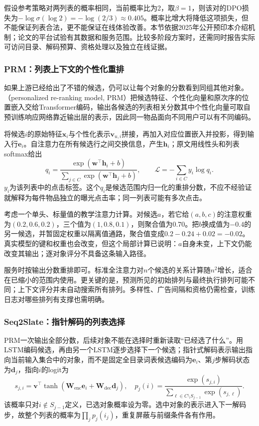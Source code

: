 假设参考策略对两列表的概率相同，当前概率比为2，取$\beta=1$，则该对的DPO损失为$-\log\sigma(\log2)=-\log(2/3)\approx0.405$。概率比增大将降低这项损失，但不能保证列表合法，更不能保证在线体验改善。本节依据2025年公开预印本介绍机制；论文的平台试验有其数据和服务范围。比较多阶段方案时，还需同时报告实际可访问目录、解码预算、资格处理以及独立在线证据。

\subsubsection{PRM：列表上下文的个性化重排}
\label{sec:rs-prm}

如果上游已经给出了不错的候选，仍可以让每个对象的分数看到同组其他对象。（personalized re-ranking model, PRM）把候选特征、个性化向量和原次序的位置嵌入交给Transformer编码，输出各候选的列表相关分数其中个性化向量可取自预训练响应网络靠近输出层的表示，因此同一物品面向不同用户可以有不同编码。

将候选$i$的原始特征$\bm x_i$与个性化表示$\bm v_{u,i}$拼接，再加入对应位置嵌入并投影，得到输入行$\bm e_i$。自注意力在所有候选行之间交换信息，产生$\bm h_i$；原文用线性头和列表softmax给出
\[
 q_i=\frac{\exp(\bm w^\top\bm h_i+b)}
 {\sum_{j\in C}\exp(\bm w^\top\bm h_j+b)},
 \qquad
 \mathcal L=-\sum_{i\in C}y_i\log q_i.
\]
$y_i$为该列表中的点击标签。这个$q_i$是候选范围内归一化的重排分数，不应不经验证就解释为每件物品独立的曝光点击率；同一列表可能有多次点击。

考虑一个单头、标量值的教学注意力计算。对候选$a$，若它给$(a,b,c)$的注意权重为$(0.2,0.6,0.2)$，三个值为$(1,0.8,0.1)$，则聚合值为0.70。把$b$换成值为$-0.4$的另一候选，并暂固定权重以隔离值通路，聚合值变成$0.2-0.24+0.02=-0.02$。真实模型的键和权重也会改变，但这个局部计算已说明：$a$自身未变，上下文仍能改变其输出；逐对象评分不具备这条输入路径。

服务时按输出分数重排即可。标准全注意力对$n$个候选的关系计算随$n^2$增长，适合在已缩小的范围内使用。更关键的是，预测所见的初始排列与最终执行排列可能不同；上下文评分并未自动搜索所有排列。多样性、广告间隔和资格仍需检查，训练日志对哪些排列有支撑也需明确。

\subsubsection{Seq2Slate：指针解码的列表选择}
\label{sec:rs-seq2slate}

PRM一次输出全部分数，后续对象不能在选择时重新读取“已经选了什么”。用LSTM编码候选，再由另一个LSTM逐步选择下一个候选；指针式解码表示输出指向当前输入集合中的对象，而不是固定全目录词表候选编码为$\bm e_i$、第$j$步解码状态为$\bm d_j$，指向$i$的logit为
\begin{equation}
 s_{j,i}=\bm v^\top\tanh(\bm W_{\mathrm{enc}}\bm e_i+
                          \bm W_{\mathrm{dec}}\bm d_j),
 \quad
 p_j(i)=\frac{\exp(s_{j,i})}
 {\sum_{\ell\in C\setminus S_{j-1}}\exp(s_{j,\ell})}.
 \label{eq:rs-seq2slate}
\end{equation}
该概率只对$i\notin S_{j-1}$定义，已选对象概率设为零。选中对象的表示进入下一解码步，故整个列表的概率为$\prod_j p_j(i_j)$，重复屏蔽与前缀条件各有作用。


